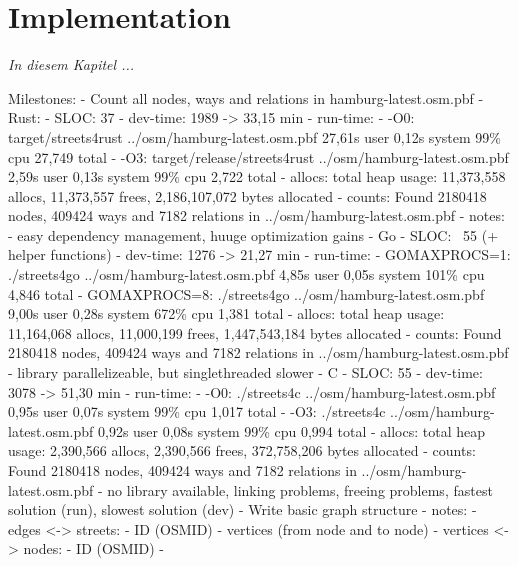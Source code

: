 \chapter{Implementation}
\label{chap:Implementation}

\textit{%
In diesem Kapitel ...
}
\bigskip


Milestones:
    - Count all nodes, ways and relations in hamburg-latest.osm.pbf
        - Rust:
            - SLOC: 37
            - dev-time: 1989 -> 33,15 min
            - run-time:
                - -O0: target/streets4rust ../osm/hamburg-latest.osm.pbf  27,61s user 0,12s system 99\% cpu 27,749 total
                - -O3: target/release/streets4rust ../osm/hamburg-latest.osm.pbf  2,59s user 0,13s system 99\% cpu 2,722 total
            - allocs: total heap usage: 11,373,558 allocs, 11,373,557 frees, 2,186,107,072 bytes allocated
            - counts: Found 2180418 nodes, 409424 ways and 7182 relations in ../osm/hamburg-latest.osm.pbf
            - notes:
                - easy dependency management, huuge optimization gains
        - Go
            - SLOC: ~55 (+ helper functions)
            - dev-time: 1276 -> 21,27 min
            - run-time:
                - GOMAXPROCS=1: ./streets4go ../osm/hamburg-latest.osm.pbf  4,85s user 0,05s system 101\% cpu 4,846 total
                - GOMAXPROCS=8: ./streets4go ../osm/hamburg-latest.osm.pbf  9,00s user 0,28s system 672\% cpu 1,381 total
            - allocs: total heap usage: 11,164,068 allocs, 11,000,199 frees, 1,447,543,184 bytes allocated
            - counts: Found 2180418 nodes, 409424 ways and 7182 relations in ../osm/hamburg-latest.osm.pbf
                - library parallelizeable, but singlethreaded slower
        - C
            - SLOC: 55
            - dev-time: 3078 -> 51,30 min
            - run-time:
                - -O0: ./streets4c ../osm/hamburg-latest.osm.pbf  0,95s user 0,07s system 99\% cpu 1,017 total
                - -O3: ./streets4c ../osm/hamburg-latest.osm.pbf  0,92s user 0,08s system 99\% cpu 0,994 total
            - allocs: total heap usage: 2,390,566 allocs, 2,390,566 frees, 372,758,206 bytes allocated
            - counts: Found 2180418 nodes, 409424 ways and 7182 relations in ../osm/hamburg-latest.osm.pbf
                - no library available, linking problems, freeing problems, fastest solution (run), slowest solution (dev)
    - Write basic graph structure
        - notes:
            - edges <-> streets:
                - ID (OSMID)
                - vertices (from node and to node)
            - vertices <-> nodes:
                - ID (OSMID)
                -

